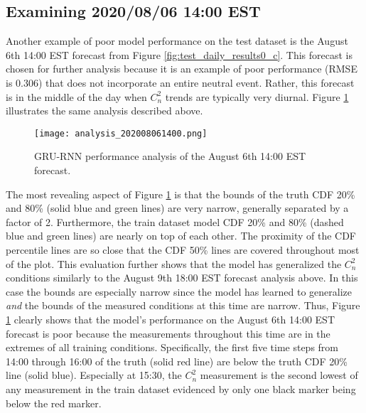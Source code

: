 \subsection{Examining 2020/08/06 14:00 EST}
Another example of poor model performance on the test dataset is the August 6th 14:00 EST forecast from Figure \ref{fig:test_daily_results0_c}. This forecast is chosen for further analysis because it is an example of poor performance (RMSE is 0.306) that does not incorporate an entire neutral event. Rather, this forecast is in the middle of the day when $C_{n}^{2}$ trends are typically very diurnal. Figure \ref{fig:analysis_08061400} illustrates the same analysis described above.
\begin{figure}[h!]
	\centering
	\texttt{[image: analysis\_202008061400.png]}
	\caption{GRU-RNN performance analysis of the August 6th 14:00 EST forecast.}
	\label{fig:analysis_08061400}
\end{figure}
The most revealing aspect of Figure \ref{fig:analysis_08061400} is that the bounds of the truth CDF 20\% and 80\% (solid blue and green lines) are very narrow, generally separated by a factor of 2. Furthermore, the train dataset model CDF 20\% and 80\% (dashed blue and green lines) are nearly on top of each other. The proximity of the CDF percentile lines are so close that the CDF 50\% lines are covered throughout most of the plot. This evaluation further shows that the model has generalized the $C_{n}^{2}$ conditions similarly to the August 9th 18:00 EST forecast analysis above. In this case the bounds are especially narrow since the model has learned to generalize \emph{and} the bounds of the measured conditions at this time are narrow. Thus, Figure \ref{fig:analysis_08061400} clearly shows that the model's performance on the August 6th 14:00 EST forecast is poor because the measurements throughout this time are in the extremes of all training conditions. Specifically, the first five time steps from 14:00 through 16:00 of the truth (solid red line) are below the truth CDF 20\% line (solid blue). Especially at 15:30, the $C_{n}^{2}$ measurement is the second lowest of any measurement in the train dataset evidenced by only one black marker being below the red marker.

